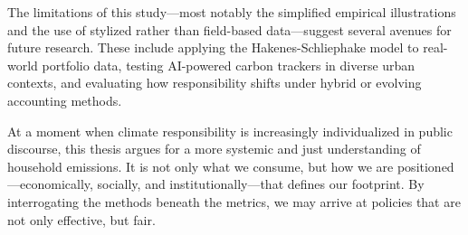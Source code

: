\documentclass[12pt,a4paper]{article}%
\begin{document}
The limitations of this study—most notably the simplified empirical illustrations and the use of stylized rather than field-based data—suggest several avenues for future research. These include applying the Hakenes-Schliephake model to real-world portfolio data, testing AI-powered carbon trackers in diverse urban contexts, and evaluating how responsibility shifts under hybrid or evolving accounting methods.

At a moment when climate responsibility is increasingly individualized in public discourse, this thesis argues for a more systemic and just understanding of household emissions. It is not only what we consume, but how we are positioned—economically, socially, and institutionally—that defines our footprint. By interrogating the methods beneath the metrics, we may arrive at policies that are not only effective, but fair.
\end{document}
